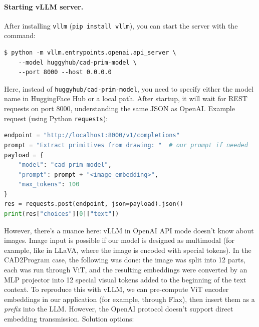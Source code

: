 \documentclass{article}
\begin{document}
\paragraph{Starting vLLM server.} After installing \texttt{vllm} (\texttt{pip install vllm}), you can start the server with the command:
\begin{verbatim}
$ python -m vllm.entrypoints.openai.api_server \
    --model huggyhub/cad-prim-model \
    --port 8000 --host 0.0.0.0
\end{verbatim}
Here, instead of \texttt{huggyhub/cad-prim-model}, you need to specify either the model name in HuggingFace Hub or a local path. After startup, it will wait for REST requests on port 8000, understanding the same JSON as OpenAI. Example request (using Python \texttt{requests}):
\begin{lstlisting}[language=Python]
endpoint = "http://localhost:8000/v1/completions"
prompt = "Extract primitives from drawing: "  # our prompt if needed
payload = {
    "model": "cad-prim-model",
    "prompt": prompt + "<image_embedding>",
    "max_tokens": 100
}
res = requests.post(endpoint, json=payload).json()
print(res["choices"][0]["text"])
\end{lstlisting}
However, there's a nuance here: vLLM in OpenAI API mode doesn't know about images. Image input is possible if our model is designed as multimodal (for example, like in LLaVA, where the image is encoded with special tokens). In the CAD2Program case, the following was done: the image was split into 12 parts, each was run through ViT, and the resulting embeddings were converted by an MLP projector into 12 special visual tokens added to the beginning of the text context. To reproduce this with vLLM, we can pre-compute ViT encoder embeddings in our application (for example, through Flax), then insert them as a \emph{prefix} into the LLM. However, the OpenAI protocol doesn't support direct embedding transmission. Solution options:
\end{document}
